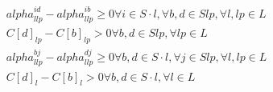 \begin{align}
  & \mathit{alpha}_{l lp}^{i d} - \mathit{alpha}_{l lp}^{i b} \geq 0 \forall i \in S \cdot l , \forall b , d \in S lp , \forall l , lp \in L \tag{eq\_0041} \\
  & C \left[d\right]_{lp} - C \left[b\right]_{lp} > 0 \forall b , d \in S lp , \forall lp \in L \tag{eq\_0042} \\
  & \mathit{alpha}_{l lp}^{b j} - \mathit{alpha}_{l lp}^{d j} \geq 0 \forall b , d \in S \cdot l , \forall j \in S lp , \forall l , lp \in L \tag{eq\_0043} \\
  & C \left[d\right]_{l} - C \left[b\right]_{l} > 0 \forall b , d \in S \cdot l , \forall l \in L \tag{eq\_0044} \\
\end{align}
